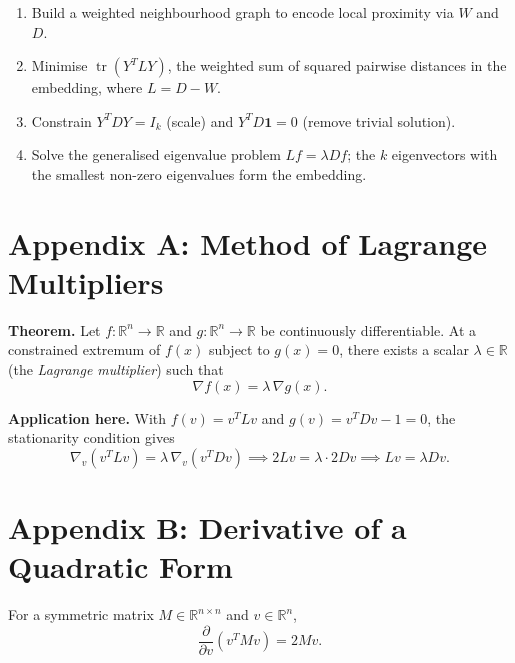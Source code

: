 \documentclass[11pt]{article}
\begin{document}
\begin{enumerate}
  \item Build a weighted neighbourhood graph to encode local proximity via $W$ and $D$.
  \item Minimise $\operatorname{tr}(Y^T L Y)$, the weighted sum of squared pairwise distances in the embedding, where $L = D - W$.
  \item Constrain $Y^T D Y = I_k$ (scale) and $Y^T D \mathbf{1} = 0$ (remove trivial solution).
  \item Solve the generalised eigenvalue problem $L f = \lambda D f$; the $k$ eigenvectors with the smallest non-zero eigenvalues form the embedding.
\end{enumerate}

\begin{center}
\end{center}

\appendix
\section*{Appendix A: Method of Lagrange Multipliers}

\textbf{Theorem.}
Let $f : \mathbb{R}^n \to \mathbb{R}$ and $g : \mathbb{R}^n \to
\mathbb{R}$ be continuously differentiable.  At a constrained extremum
of $f(x)$ subject to $g(x) = 0$, there exists a scalar $\lambda \in
\mathbb{R}$ (the \emph{Lagrange multiplier}) such that
\[
  \nabla f(x) = \lambda\, \nabla g(x).
\]

\textbf{Application here.}
With $f(v) = v^T L v$ and $g(v) = v^T D v - 1 = 0$, the stationarity
condition gives
\[
  \nabla_v (v^T L v) = \lambda\, \nabla_v (v^T D v)
  \implies 2Lv = \lambda\cdot 2Dv
  \implies Lv = \lambda Dv.
\]

\section*{Appendix B: Derivative of a Quadratic Form}

For a symmetric matrix $M \in \mathbb{R}^{n\times n}$ and $v\in\mathbb{R}^n$,
\[
  \frac{\partial}{\partial v}(v^T M v) = 2Mv.
\]
\end{document}
